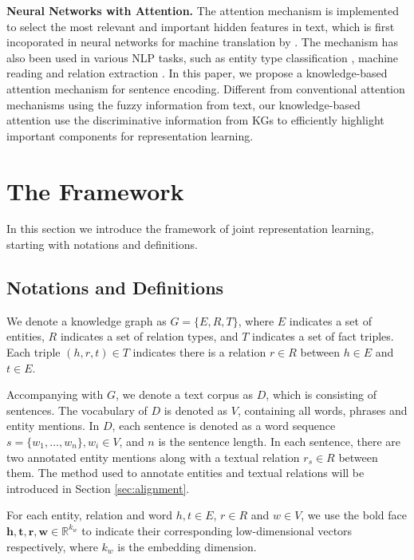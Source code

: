 \documentclass[11pt,a4paper]{article}
\begin{document}
\textbf{Neural Networks with Attention.} The attention mechanism is implemented to select the most relevant and important hidden features in text, which is first incoporated in neural networks for machine translation by . The mechanism has also been used in various NLP tasks, such as entity type classification \cite{shimaoka2016attentive}, machine reading \cite{dhingra2016gated,sordoni2016iterative} and relation extraction \cite{lin2016neural}. In this paper, we propose a knowledge-based attention mechanism for sentence encoding. Different from conventional attention mechanisms using the fuzzy information from text, our knowledge-based attention use the discriminative information from KGs to efficiently highlight important components for representation learning.


\section{The Framework}
In this section we introduce the framework of joint representation learning, starting with notations and definitions.

\subsection{Notations and Definitions}

We denote a knowledge graph as $G = \{E, R, T\}$, where $E$ indicates a set of entities, $R$ indicates a set of relation types, and $T$ indicates a set of fact triples. Each triple $(h, r, t) \in T$ indicates there is a relation $r \in R$ between $h \in E$ and $t \in E$.

Accompanying with $G$, we denote a text corpus as $D$, which is consisting of sentences. The vocabulary of $D$ is denoted as $V$, containing all words, phrases and entity mentions. In $D$, each sentence is denoted as a word sequence $s = \{w_1, \ldots, w_n\}, w_i \in V$, and $n$ is the sentence length. In each sentence, there are two annotated entity mentions along with a textual relation $r_s \in R$ between them. The method used to annotate entities and textual relations will be introduced in Section \ref{sec:alignment}. 

For each entity, relation and word $h, t \in E$, $r \in R$ and $w \in V$, we use the bold face $\mathbf{h}, \mathbf{t}, \mathbf{r}, \mathbf{w} \in \mathbb{R}^{k_w}$ to indicate their corresponding low-dimensional vectors respectively, where $k_w$ is the embedding dimension.
\end{document}
